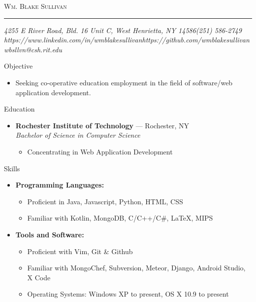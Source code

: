 \documentclass[10pt,oneside]{article}
\makeatletter
\newcommand{\name}{Wm. Blake Sullivan}
\newcommand{\addr}{4255 E River Road, Bld. 16 Unit C, West Henrietta, NY 14586}
\newcommand{\phone}{(251) 586-2749}
\newcommand{\email}{wbsllvn@csh.rit.edu}
\newcommand{\github}{https://github.com/wmblakesullivan}
\newcommand{\linkedin}{https://www.linkedin.com/in/wmblakesullivan}
\newcommand{\bigname}[1]{
	\begin{center}\fontfamily{bch}\selectfont\Huge\scshape#1\end{center}
}
\newenvironment{ressection}[1]{
	\vspace{3pt}
	{\fontfamily{bch}\selectfont\Large#1}
	\begin{itemize}
	\vspace{2pt}
}{
	\end{itemize}
}
\newcommand{\resitem}[1]{
	\vspace{-2pt}
	\item \begin{flushleft} #1 \end{flushleft}
}
\newcommand{\ressubitem}[1]{
	\vspace{-1pt}
	\item \begin{flushleft} #1 \end{flushleft}
}
\newcommand{\resbigitem}[3]{
	\vspace{-3pt}
	\item
	\textbf{#1} --- #2 \\
	\textit{#3}
}
\newenvironment{ressubsec}[3]{
	\resbigitem{#1}{#2}{#3}
	\vspace{-1pt}
	\begin{itemize}
}{
	\end{itemize}
}
\newenvironment{reslist}[1]{
	\resitem{\textbf{#1}}
	\vspace{-3pt}
	\begin{itemize}
}{
	\end{itemize}
}
\makeatother
\begin{document}
 \selectfont

\bigname{\name}

\vspace{-4pt} \rule{\textwidth}{1pt}

\vspace{-1pt} {\normalsize\itshape \addr \hfill \phone \\ \linkedin \hfill \github \\ \email}

\vspace{15 pt}



  \begin{ressection}{Objective}

  	\ressubitem{Seeking co-operative education employment in the field of software/web application development.}

  \end{ressection}


\begin{ressection}{Education}

	\begin{ressubsec}{Rochester Institute of Technology}{Rochester, NY}{Bachelor of Science in Computer Science}
		\ressubitem{Concentrating in Web Application Development}
	\end{ressubsec}

\end{ressection}


\begin{ressection}{Skills}


	\begin{reslist}{Programming Languages:}
		\ressubitem{Proficient in Java, Javascript, Python, HTML, CSS}
		\ressubitem{Familiar with Kotlin, MongoDB, C/C++/C\#, \LaTeX, MIPS}
	\end{reslist}

	\begin{reslist}{Tools and Software:}
		\ressubitem{Proficient with Vim, Git \& Github}
		\ressubitem{Familiar with MongoChef, Subversion, Meteor, Django, Android Studio, X Code}
		\ressubitem{Operating Systems: Windows XP to present, OS X 10.9 to present}
	\end{reslist}

\end{ressection}
\end{document}
